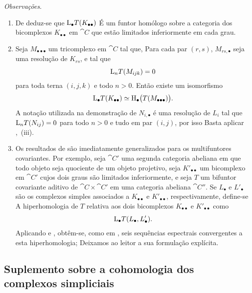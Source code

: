 \begin{env}[11.7.3]
\label{0.11.7.3}
\emph{Observações}.
\begin{enumerate}
  \item[{\rm(i)}]
  De  deduz-se que
  $\mathrm{L}_\bullet T(K_{\bullet\bullet})$ É um funtor homólogo sobre a
  categoria dos bicomplexos $K_{\bullet\bullet}$ em $\cat{C}$ que estão
  limitados inferiormente em cada grau.

  \item[{\rm(ii)}]
  Seja $M_{\bullet\bullet\bullet}$ um tricomplexo em $\cat{C}$ tal que,
  Para cada par $(r,s)$, $M_{rs,\bullet}$ seja uma resolução de $K_{rs}$,
  e tal que
  \[
    \mathrm{L}_nT(M_{ijk})=0
  \]
  para toda terna $(i,j,k)$ e todo $n>0$.
  Então existe um isomorfismo
  \[
    \mathrm{L}_\bullet T(K_{\bullet\bullet})
    \simeq
    \mathrm{H}_\bullet\bigl(T(M_{\bullet\bullet\bullet})\bigr).
  \]
  A notação utilizada na demonstração de 
  $N_{i,\bullet}$ é uma resolução de $L_i$ tal que
  $\mathrm{L}_nT(N_{ij})=0$ para todo $n>0$ e tudo em par $(i,j)$, por isso
  Basta aplicar ,~(iii).

  \item[{\rm(iii)}]
  Os resultados de  são imediatamente generalizados para os
  multifuntores covariantes.
  Por exemplo, seja $\cat{C}'$ uma segunda categoria abeliana em que todo
  objeto seja quociente de um objeto projetivo, seja
  $K'_{\bullet\bullet}$ um bicomplexo em $\cat{C}'$ cujos dois graus são
  limitados inferiormente, e seja $T$ um bifuntor covariante aditivo de
  $\cat{C}\times\cat{C}'$ em uma categoria abeliana $\cat{C}''$.
  Se $L_\bullet$ e $L'_\bullet$ são os complexos simples associados a
  $K_{\bullet\bullet}$ e $K'_{\bullet\bullet}$, respectivamente, define-se
  A hiperhomologia de $T$ relativa aos dois bicomplexos
  $K_{\bullet\bullet}$ e $K'_{\bullet\bullet}$ como
  \[
    \mathrm{L}_\bullet T(L_\bullet,L'_\bullet).
  \]
  Aplicando  e , obtêm-se, como em
  , seis sequências espectrais convergentes a esta hiperhomologia;
  Deixamos ao leitor a sua formulação explícita.
\end{enumerate}
\end{env}

\subsection{Suplemento sobre a cohomologia dos complexos simpliciais}
\label{subsection:0.11.8}

